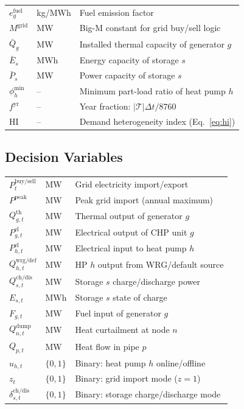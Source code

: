 \documentclass[review,3p]{elsarticle}
\begin{document}
\begin{tabular}{@{}p{2.8cm}p{2.2cm}p{7.5cm}@{}}
$e_g^{\mathrm{fuel}}$                  & kg/MWh          & Fuel emission factor \\
$M^{\mathrm{grid}}$                    & MW              & Big-M constant for grid buy/sell logic \\
$\bar{Q}_g$                            & MW              & Installed thermal capacity of generator $g$ \\
$\bar{E}_s$                            & MWh             & Energy capacity of storage $s$ \\
$\bar{P}_s$                            & MW              & Power capacity of storage $s$ \\
$\phi_h^{\mathrm{min}}$                & --              & Minimum part-load ratio of heat pump $h$ \\
$f^{\mathrm{yr}}$                      & --              & Year fraction: $|\mathcal{T}|\Delta t / 8760$ \\
$\mathrm{HI}$                          & --              & Demand heterogeneity index (Eq.~\ref{eq:hi}) \\
\end{tabular}

\subsection*{Decision Variables}
\begin{tabular}{@{}p{2.8cm}p{2.2cm}p{7.5cm}@{}}
$P_t^{\mathrm{buy/sell}}$         & MW        & Grid electricity import/export \\
$P^{\mathrm{peak}}$               & MW        & Peak grid import (annual maximum) \\
$Q_{g,t}^{\mathrm{th}}$          & MW        & Thermal output of generator $g$ \\
$P_{g,t}^{\mathrm{el}}$          & MW        & Electrical output of CHP unit $g$ \\
$P_{h,t}^{\mathrm{el}}$          & MW        & Electrical input to heat pump $h$ \\
$Q_{h,t}^{\mathrm{wrg/def}}$     & MW        & HP $h$ output from WRG/default source \\
$Q_{s,t}^{\mathrm{ch/dis}}$      & MW        & Storage $s$ charge/discharge power \\
$E_{s,t}$                        & MWh       & Storage $s$ state of charge \\
$F_{g,t}$                        & MW        & Fuel input of generator $g$ \\
$Q_{n,t}^{\mathrm{dump}}$        & MW        & Heat curtailment at node $n$ \\
$Q_{p,t}$                        & MW        & Heat flow in pipe $p$ \\
$u_{h,t}$                        & $\{0,1\}$ & Binary: heat pump $h$ online/offline \\
$z_t$                            & $\{0,1\}$ & Binary: grid import mode ($z=1$) \\
$\delta_{s,t}^{\mathrm{ch/dis}}$ & $\{0,1\}$ & Binary: storage charge/discharge mode \\
\end{tabular}
\end{document}
